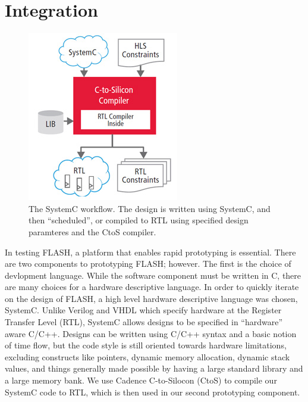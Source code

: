 \documentclass{sig-alternate-10pt}
\begin{document}
\section{Integration}
\label{sec:integration}
\begin{figure}
	\begin{center}
		\includegraphics[width=0.9\linewidth]{fig/hlsctos.jpg}
		\caption{
			The SystemC workflow. The design is written using SystemC, and then ``scheduled'', or compiled to RTL using specified design paramteres and the CtoS compiler.
		}
		\label{fig:ctos_overview}
	\end{center}
\end{figure}

In testing FLASH, a platform that enables rapid prototyping is essential.
There are two components to prototyping FLASH; however. The first is the
choice of devlopment language. While the software component must be written
in C, there are many choices for a hardware descriptive language. In order
to quickly iterate on the design of FLASH, a high level hardware descriptive
language was chosen, SystemC. Unlike Verilog and VHDL which specify hardware
at the Register Transfer Level (RTL), SystemC allows designs to
be specified in ``hardware'' aware C/C++. Designs can be written using C/C++
syntax and a basic notion of time flow, but the code style is still oriented
towards hardware limitations, excluding constructs like pointers, dynamic
memory allocation, dynamic stack values, and things generally made possible
by having a large standard library and a large memory bank. We use Cadence
C-to-Silocon (CtoS) to compile our SystemC code to RTL, which is then used
in our second prototyping component.
\end{document}
